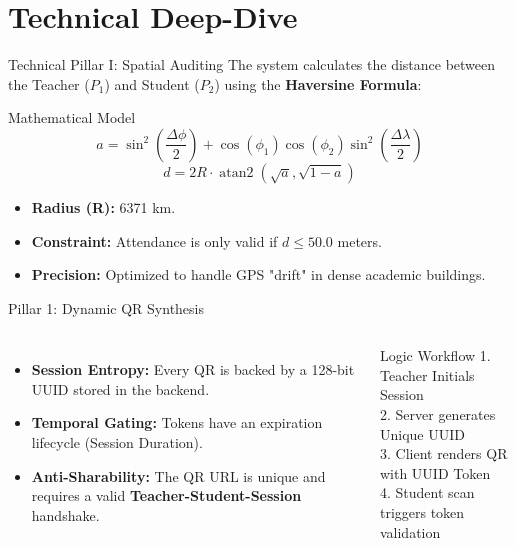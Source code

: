 \documentclass[11pt, aspectratio=169]{beamer}
\begin{document}
\section{Technical Deep-Dive}
\begin{frame}{Technical Pillar I: Spatial Auditing}
    The system calculates the distance between the Teacher ($P_1$) and Student ($P_2$) using the \textbf{Haversine Formula}:
    \begin{block}{Mathematical Model}
        \begin{equation*}
            a = \sin^2\left(\frac{\Delta\phi}{2}\right) + \cos(\phi_1)\cos(\phi_2)\sin^2\left(\frac{\Delta\lambda}{2}\right)
        \end{equation*}
        \begin{equation*}
            d = 2R \cdot \operatorname{atan2}\left(\sqrt{a}, \sqrt{1-a}\right)
        \end{equation*}
    \end{block}
    \begin{itemize}
        \item \textbf{Radius (R):} 6371 km.
        \item \textbf{Constraint:} Attendance is only valid if $d \leq 50.0$ meters.
        \item \textbf{Precision:} Optimized to handle GPS "drift" in dense academic buildings.
    \end{itemize}
\end{frame}

\begin{frame}{Pillar 1: Dynamic QR Synthesis}
    \begin{columns}
        \begin{itemize}
            \item \textbf{Session Entropy:} Every QR is backed by a 128-bit UUID stored in the backend.
            \item \textbf{Temporal Gating:} Tokens have an expiration lifecycle (Session Duration).
            \item \textbf{Anti-Sharability:} The QR URL is unique and requires a valid \textbf{Teacher-Student-Session} handshake.
        \end{itemize}
        \begin{block}{Logic Workflow}
            \scriptsize
            1. Teacher Initials Session \\
            2. Server generates Unique UUID \\
            3. Client renders QR with UUID Token \\
            4. Student scan triggers token validation
        \end{block}
    \end{columns}
\end{frame}
\end{document}
